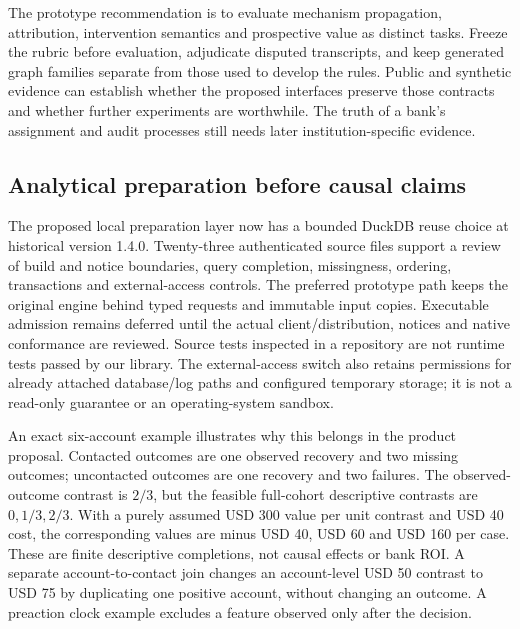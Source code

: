 The prototype recommendation is to evaluate mechanism propagation,
attribution, intervention semantics and prospective value as distinct
tasks. Freeze the rubric before evaluation, adjudicate disputed
transcripts, and keep generated graph families separate from those used
to develop the rules. Public and synthetic evidence can establish
whether the proposed interfaces preserve those contracts and whether
further experiments are worthwhile. The truth of a bank's assignment and
audit processes still needs later institution-specific evidence.

\hypertarget{analytical-preparation-before-causal-claims}{%
\subsection{Analytical preparation before causal
claims}\label{analytical-preparation-before-causal-claims}}

The proposed local preparation layer now has a bounded DuckDB reuse
choice at historical version 1.4.0. Twenty-three authenticated source
files support a review of build and notice boundaries, query completion,
missingness, ordering, transactions and external-access controls. The
preferred prototype path keeps the original engine behind typed requests
and immutable input copies. Executable admission remains deferred until
the actual client/distribution, notices and native conformance are
reviewed. Source tests inspected in a repository are not runtime tests
passed by our library. The external-access switch also retains
permissions for already attached database/log paths and configured
temporary storage; it is not a read-only guarantee or an
operating-system sandbox. \citep{exec19_duckdb_source}

An exact six-account example illustrates why this belongs in the product
proposal. Contacted outcomes are one observed recovery and two missing
outcomes; uncontacted outcomes are one recovery and two failures. The
observed-outcome contrast is \(2/3\), but the feasible full-cohort
descriptive contrasts are \(0,1/3,2/3\). With a purely assumed USD 300
value per unit contrast and USD 40 cost, the corresponding values are
minus USD 40, USD 60 and USD 160 per case. These are finite descriptive
completions, not causal effects or bank ROI. A separate
account-to-contact join changes an account-level USD 50 contrast to USD
75 by duplicating one positive account, without changing an outcome. A
preaction clock example excludes a feature observed only after the
decision. \citep{exec19_duckdb_reference}

